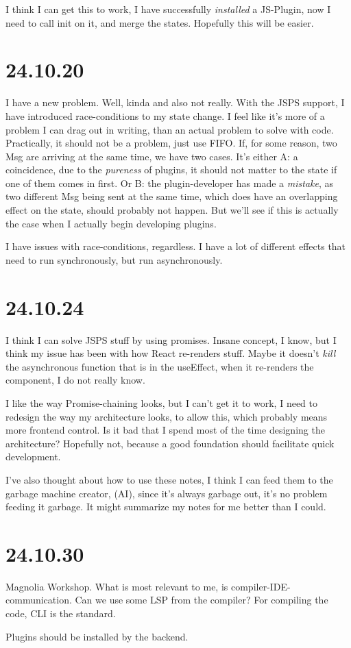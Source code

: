I think I can get this to work, I have successfully \textit{installed} a
JS-Plugin, now I need to call init on it, and merge the states. Hopefully this
will be easier.


\section{24.10.20}

I have a new problem. Well, kinda and also not really. With the JSPS support, I
have introduced race-conditions to my state change. I feel like it's more of a
problem I can drag out in writing, than an actual problem to solve with code.
Practically, it should not be a problem, just use FIFO. If, for some reason, two
Msg are arriving at the same time, we have two cases. It's either A: a
coincidence, due to the \textit{pureness} of plugins, it should not matter to
the state if one of them comes in first. Or B: the plugin-developer has made a
\textit{mistake}, as two different Msg being sent at the same time, which does
have an overlapping effect on the state, should probably not happen.
But we'll see if this is actually the case when I actually begin developing
plugins.

I have issues with race-conditions, regardless. I have a lot of different
effects that need to run synchronously, but run asynchronously.


\section{24.10.24}

I think I can solve JSPS stuff by using promises. Insane concept, I know, but I
think my issue has been with how React re-renders stuff. Maybe it doesn't
\textit{kill} the asynchronous function that is in the useEffect, when it
re-renders the component, I do not really know.

I like the way Promise-chaining looks, but I can't get it to work, I need to
redesign the way my architecture looks, to allow this, which probably means
more frontend control. Is it bad that I spend most of the time designing the
architecture? Hopefully not, because a good foundation should facilitate quick
development.

I've also thought about how to use these notes, I think I can feed them to the
garbage machine creator, (AI), since it's always garbage out, it's no problem
feeding it garbage. It might summarize my notes for me better than I could.


\section{24.10.30}

Magnolia Workshop. What is most relevant to me, is compiler-IDE-communication.
Can we use some LSP from the compiler? For compiling the code, CLI is the
standard.

Plugins should be installed by the backend.
